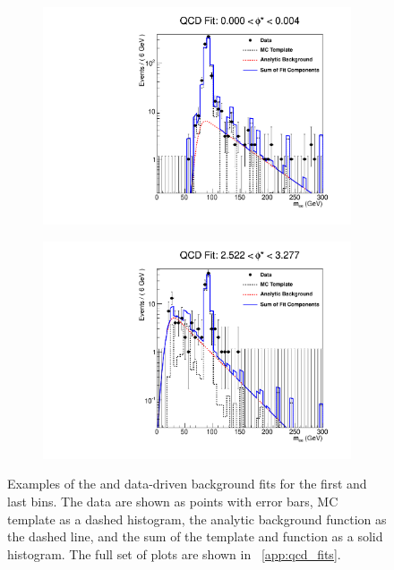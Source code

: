 \begin{figure}[!htbp]
    \centering
    \begin{subfigure}[b]{\SideBySidePlotWidth}
        \includegraphics[width=\linewidth]{figures/qcd_fits/qcd_fit_plot_for_01.pdf}
        \caption{}
        \label{fig:qcd_fit_example_01}
    \end{subfigure}%
    \begin{subfigure}[b]{\SideBySidePlotWidth}
        \includegraphics[width=\linewidth]{figures/qcd_fits/qcd_fit_plot_for_34.pdf}
        \caption{}
        \label{fig:qcd_fit_example_34}
    \end{subfigure}
    \caption[
       Examples of the \QCDjets and \wjets data-driven background fits.
    ]{
       Examples of the \QCDjets and \wjets data-driven background fits for the
       first and last \phistar bins. The data are shown as points with error
       bars, MC template as a dashed histogram, the analytic background
       function as the dashed line, and the sum of the template and function as
       a solid histogram. The full set of plots are shown in
       \APP~\ref{app:qcd_fits}.
    }
    \label{fig:qcd_example_fits}
\end{figure}


